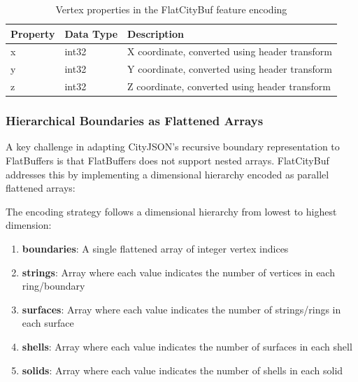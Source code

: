 \begin{itemize}
    \begin{table}[h]
      \centering
      \caption{Vertex properties in the FlatCityBuf feature encoding}
      \label{tab:vertex_properties}
      \small
      \begin{tabularx}{\textwidth}{@{}llX@{}}
        \toprule
        \textbf{Property} & \textbf{Data Type} & \textbf{Description} \\
        \midrule
        x & int32 & X coordinate, converted using header transform \\
        y & int32 & Y coordinate, converted using header transform \\
        z & int32 & Z coordinate, converted using header transform \\
        \bottomrule
      \end{tabularx}
    \end{table}
\end{itemize}

\subsubsection{Hierarchical Boundaries as Flattened Arrays}
\label{methodology:feature_encoding:geometry_encoding:flattened_arrays}

A key challenge in adapting CityJSON's recursive boundary representation to FlatBuffers is that FlatBuffers does not support nested arrays. FlatCityBuf addresses this by implementing a dimensional hierarchy encoded as parallel flattened arrays:

The encoding strategy follows a dimensional hierarchy from lowest to highest dimension:

\begin{enumerate}
  \item \textbf{boundaries}: A single flattened array of integer vertex indices
  \item \textbf{strings}: Array where each value indicates the number of vertices in each ring/boundary
  \item \textbf{surfaces}: Array where each value indicates the number of strings/rings in each surface
  \item \textbf{shells}: Array where each value indicates the number of surfaces in each shell
  \item \textbf{solids}: Array where each value indicates the number of shells in each solid
\end{enumerate}

